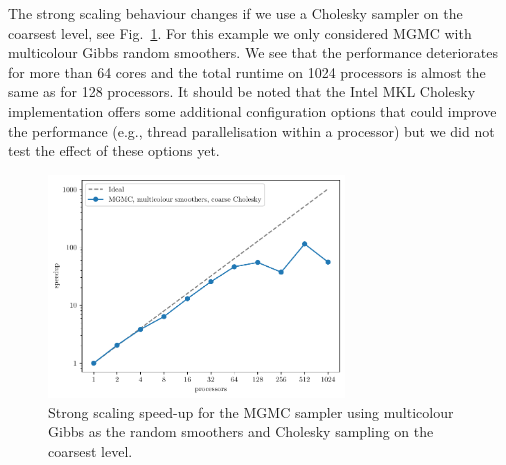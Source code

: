 \documentclass[
fontsize=11pt,
paper=a4,
numbers=noenddot
]{scrartcl}
\begin{document}
The strong scaling behaviour changes if we use a Cholesky sampler on the coarsest level, see Fig.~\ref{fig:2d_structured_mgmc_chol_ss}. For this example we only considered MGMC with multicolour Gibbs random smoothers. We see that the performance deteriorates for more than 64 cores and the total runtime on 1024 processors is almost the same as for 128 processors. It should be noted that the Intel MKL Cholesky implementation offers some additional configuration options that could improve the performance (e.g., thread parallelisation within a processor) but we did not test the effect of these options yet.

\begin{figure}[htbp]
    \centering
    \includegraphics[width=0.7\textwidth]{plots/strong_scaling_mgmc+mg+cholesky_4097x4097.pdf}
    \caption{Strong scaling speed-up for the MGMC sampler using multicolour Gibbs as the random smoothers and Cholesky sampling on the coarsest level.}
    \label{fig:2d_structured_mgmc_chol_ss}
\end{figure}
\end{document}
